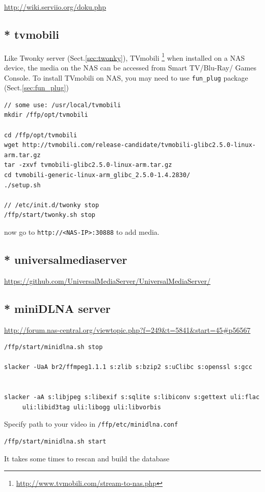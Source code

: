\url{http://wiki.serviio.org/doku.php}


\subsection{* tvmobili}
\label{sec:tvmobili}

Like Twonky server (Sect.\ref{sec:twonky}), TVmobili
\footnote{\url{http://www.tvmobili.com/stream-to-nas.php}} when installed on a
NAS device, the media on the NAS can be accessed from Smart TV/Blu-Ray/ Games
Console. To install TVmobili on NAS, you may need to use \verb!fun_plug! package
(Sect.\ref{sec:fun_plug})


\begin{verbatim}
// some use: /usr/local/tvmobili
mkdir /ffp/opt/tvmobili

cd /ffp/opt/tvmobili
wget http://tvmobili.com/release-candidate/tvmobili-glibc2.5.0-linux-arm.tar.gz
tar -zxvf tvmobili-glibc2.5.0-linux-arm.tar.gz
cd tvmobili-generic-linux-arm_glibc_2.5.0-1.4.2830/
./setup.sh

// /etc/init.d/twonky stop
/ffp/start/twonky.sh stop
\end{verbatim}
now go to \verb!http://<NAS-IP>:30888! to add media.


\subsection{* universalmediaserver}

\url{https://github.com/UniversalMediaServer/UniversalMediaServer/}

\subsection{* miniDLNA server}

\url{http://forum.nas-central.org/viewtopic.php?f=249&t=5841&start=45#p56567}

\begin{verbatim}
/ffp/start/minidlna.sh stop

slacker -UaA br2/ffmpeg1.1.1 s:zlib s:bzip2 s:uClibc s:openssl s:gcc


slacker -aA s:libjpeg s:libexif s:sqlite s:libiconv s:gettext uli:flac
     uli:libid3tag uli:libogg uli:libvorbis
\end{verbatim}
Specify path to your video in \verb!/ffp/etc/minidlna.conf!

\begin{verbatim}
/ffp/start/minidlna.sh start
\end{verbatim}
It takes some times to rescan and build the database

